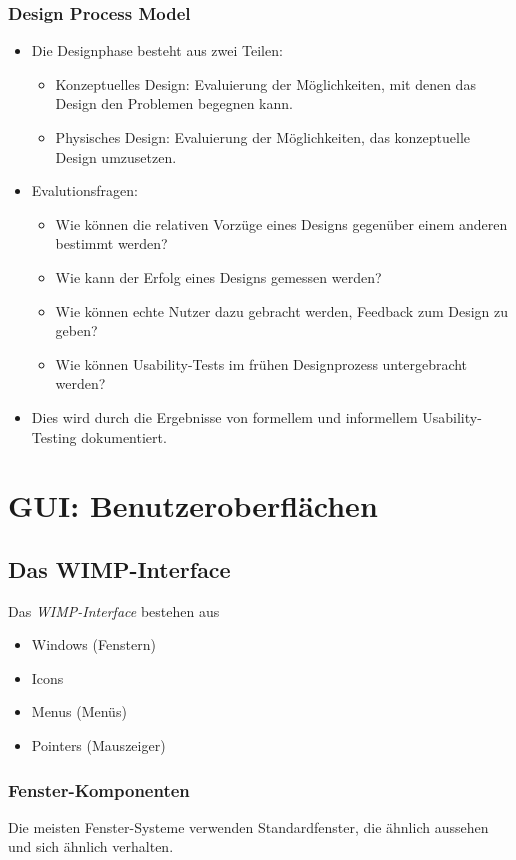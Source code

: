 			\subsubsection{Design Process Model}
				\begin{itemize}
					\item Die Designphase besteht aus zwei Teilen:
						\begin{itemize}
							\item Konzeptuelles Design: Evaluierung der Möglichkeiten, mit denen das Design den Problemen begegnen kann.
							\item Physisches Design: Evaluierung der Möglichkeiten, das konzeptuelle Design umzusetzen.
						\end{itemize}
					\item Evalutionsfragen:
						\begin{itemize}
							\item Wie können die relativen Vorzüge eines Designs gegenüber einem anderen bestimmt werden?
							\item Wie kann der Erfolg eines Designs gemessen werden?
							\item Wie können echte Nutzer dazu gebracht werden, Feedback zum Design zu geben?
							\item Wie können Usability-Tests im frühen Designprozess untergebracht werden?
						\end{itemize}
					\item Dies wird durch die Ergebnisse von formellem und informellem Usability-Testing dokumentiert.
				\end{itemize}

	\section{GUI: Benutzeroberflächen}
		\subsection{Das WIMP-Interface}
			Das \emph{WIMP-Interface} bestehen aus
			\begin{itemize}
				\item Windows (Fenstern)
				\item Icons
				\item Menus (Menüs)
				\item Pointers (Mauszeiger)
			\end{itemize}

			\subsubsection{Fenster-Komponenten}
				Die meisten Fenster-Systeme verwenden Standardfenster, die ähnlich aussehen und sich ähnlich verhalten.

